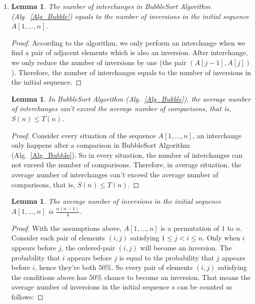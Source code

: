 \documentclass[12pt,a4paper]{article}
\makeatletter
\newtheorem{lemma}[theorem]{Lemma}
\newtheorem*{solution}{Solution}
\theoremstyle{definition}
\renewenvironment{solution}[1][Solution] {\par\pushQED{\qed}\normalfont\topsep6\p@\@plus6\p@\relax\trivlist\item[\hskip\labelsep\bfseries#1\@addpunct{.}]\ignorespaces}{\popQED\endtrivlist\@endpefalse} \makeatother
\makeatother
\begin{document}
\begin{enumerate}
\begin{solution}
        \begin{center}
        \begin{minipage}[t]{0.8 \textwidth}
        \begin{lemma}
            The number of interchanges in BubbleSort Algorithm (Alg.~\ref{Alg_Bubble}) equals to the number of inversions in the initial sequence $A[1,\dots,n]$.
            \label{lemma1}
        \end{lemma}
        \begin{proof}
            According to the algorithm, we only perform an interchange when we find a pair of adjacent elements which is also an inversion. After interchange, we only reduce the number of inversions by one (the pair $(A[j-1], A[j])$). Therefore, the number of interchanges equals to the number of inversions in the initial sequence.
        \end{proof}
        \end{minipage}

        \begin{minipage}[t]{0.8 \textwidth}
        \begin{lemma}
            In BubbleSort Algorithm (Alg.~\ref{Alg_Bubble}), the average number of interchanges can't exceed the average number of comparisons, that is, $S(n) \leq T(n)$.
            \label{lemma2}
        \end{lemma}
        \begin{proof}
            Consider every situation of the sequence $A[1,\dots,n]$, an interchange only happens after a comparison in BubbleSort Algorithm (Alg.~\ref{Alg_Bubble}). So in every situation, the number of interchanges can not exceed the number of comparisons. Therefore, in average situation, the average number of interchanges can't exceed the average number of comparisons, that is, $S(n) \leq T(n)$.
        \end{proof}
        \end{minipage}

        \begin{minipage}[t]{0.8 \textwidth}
        \begin{lemma}
            The average number of inversions in the initial sequence $A[1,\dots,n]$ is $\frac{n(n-1)}{4}$.
            \label{lemma3}
        \end{lemma}
        \begin{proof}
            With the assumptions above, $A[1,...,n]$ is a permutation of $1$ to $n$. Consider each pair of elements $(i, j)$ satisfying $1 \leq j < i \leq n$. Only when $i$ appears before $j$, the ordered-pair $(i, j)$ will become an inversion. The probability that $i$ appears before $j$ is equal to the probability that $j$ appears before $i$, hence they're both $50\%$. So every pair of elements $(i, j)$ satisfying the conditions above has $50\%$ chance to become an inversion. That means the average number of inversions in the initial sequence $s$ can be counted as follows:


\end{proof}
\end{minipage}
\end{center}
\end{solution}
\end{enumerate}
\end{document}
